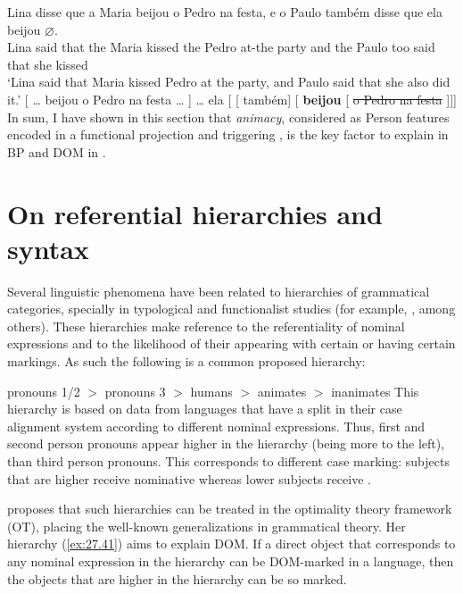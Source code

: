 \documentclass[output=paper]{langsci/langscibook}
\begin{document}
\ea\label{ex:27.39} 
    \ea
        \gll    Lina disse  que   a   Maria beijou   o Pedro na festa, e o Paulo também disse que ela  beijou \textbf{$\varnothing$}.\\
                Lina said    that the Maria kissed   the   Pedro   at-the   party and  the Paulo too       said   that  she kissed\\
        \glt    `Lina said that Maria kissed Pedro at the party, and Paulo said that she also did it.'
    \ex
        {}[ \dots{} beijou o Pedro na festa \dots{} ] \dots{} ela [ [ também] [\textbf{} \textbf{beijou} [ \sout{o Pedro na festa} ]]]\\
    \z
\z
In sum, I have shown in this section that \emph{animacy}, considered as Person
features encoded in a functional projection and triggering , is the key
factor to explain  in \gls{BP} and
DOM in .

\section{On referential hierarchies and syntax}\label{sec:27.4}

Several linguistic phenomena have been related to hierarchies of grammatical
categories, specially in typological and functionalist studies (for example,
\citealt{Silverstein1976}, among others). These hierarchies make reference to
the referentiality of nominal expressions and to the likelihood of their
appearing with certain  or having certain markings. As
such the following is a common proposed hierarchy:

\ea\label{ex:27.40}
    pronouns 1/2 $>$ pronouns 3 $>$ humans $>$ animates $>$ inanimates \citep{Silverstein1976}
\z
This hierarchy is based on data from languages that have a split in their case
alignment system according to different nominal expressions. Thus, first and
second person pronouns appear higher in the hierarchy (being more to the left),
than third person pronouns. This corresponds to different
case marking: subjects that are higher receive nominative
whereas lower subjects receive .

\textcite{Aissen1999,Aissen2003} proposes that such hierarchies can be treated
in the optimality theory framework (\gls{OT}), placing the
well-known generalizations in grammatical theory. Her hierarchy
(\ref{ex:27.41}) aims to explain DOM\@. If a direct object that corresponds
to any nominal expression in the hierarchy can be DOM-marked in a language,
then the objects that are higher in the hierarchy can be so marked.
\end{document}
